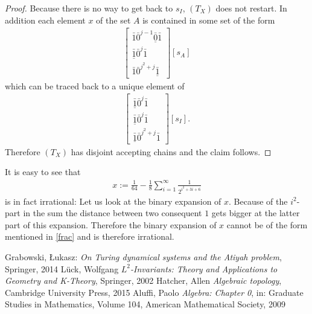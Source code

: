 \documentclass[12pt,a4paper]{scrartcl}
\theoremstyle{plain}
\theoremstyle{definition}
\newcommand{\2}{\mathbb{Z} / 2 \mathbb{Z}}
\newcommand{\1}{\bar{1}}
\newcommand{\0}{\bar{0}}
\begin{document}
\begin{proof}
	Because there is no way to get back to $s_I$, $(T_X)$ does not restart. In addition each element $x$ of the set $A$ is contained in some set of the form
	\begin{align*}
		\begin{bmatrix}
			\1 \0^{j - 1} \underline{\0} \1 \\
			\underline{\1} \0^j \1 \\
			\1 \0^{j^2 + j} \underline{\1}
		\end{bmatrix}[s_A]
	\end{align*}
	which can be traced back to a unique element of 
	\begin{align*}
		\begin{bmatrix}
			\underline{\1} \0^j \1 \\
			\underline{\1} \0^j \1 \\
			\underline{\1} \0^{j^2 + j} \1
		\end{bmatrix}[s_I].
	\end{align*}
	Therefore $(T_X)$ has disjoint accepting chains and the claim follows.
\end{proof}

It is easy to see that
\begin{align*}
	x := \frac{1}{64} - \frac{1}{8} \sum_{i = 1}^{\infty} \frac{1}{2^{i^2 + 3i + 6}}
\end{align*}
is in fact irrational:
Let us look at the binary expansion of $x$. Because of the $i^2$-part in the sum the distance between two consequent $1$ gets bigger at the latter part of this expansion. Therefore the binary expansion of $x$ cannot be of the form mentioned in \ref{frac} and is therefore irrational.



  \newpage

\begin{thebibliography}{Lam00}
  Grabowski, \L ukasz: \emph{On Turing dynamical systems and the Atiyah problem}, Springer, 2014
  Lück, Wolfgang $L^2$\emph{-Invariants: Theory and Applications to Geometry and K-Theory}, Springer, 2002
  Hatcher, Allen \emph{Algebraic topology}, Cambridge University Press, 2015
  Aluffi, Paolo \emph{Algebra: Chapter 0}, in: Graduate Studies in Mathematics, Volume 104, American Mathematical Society, 2009
\end{thebibliography}
 
      
\end{document}
